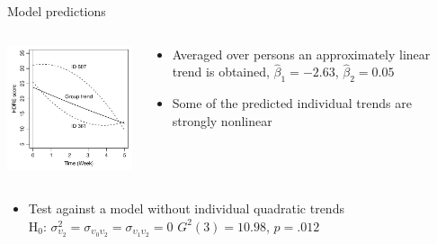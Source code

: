 \documentclass[aspectratio=169]{beamer}
\begin{document}
\begin{frame}{Model predictions}
\begin{columns}
\begin{column}{6cm}
\includegraphics[width=6cm]{../figures/hdrs-quad}
\end{column}
%
\begin{column}{5cm}
  \begin{itemize}
    \item Averaged over persons an approximately linear trend is obtained,
      $\hat{\beta}_1 = -2.63$, $\hat{\beta}_2 = 0.05$
    \item Some of the predicted individual trends are strongly nonlinear
  \end{itemize}
\end{column}
\end{columns}
  \begin{itemize}
    \item Test against a model without individual quadratic trends\\[2ex]

H$_0$: $\sigma^2_{\upsilon_2} = \sigma_{\upsilon_0 \upsilon_2} =
\sigma_{\upsilon_1 \upsilon_2} = 0$ \qquad
$G^2(3) = 10.98$, $p = .012$
  \end{itemize}
\end{frame}

% 
% 
\end{document}

